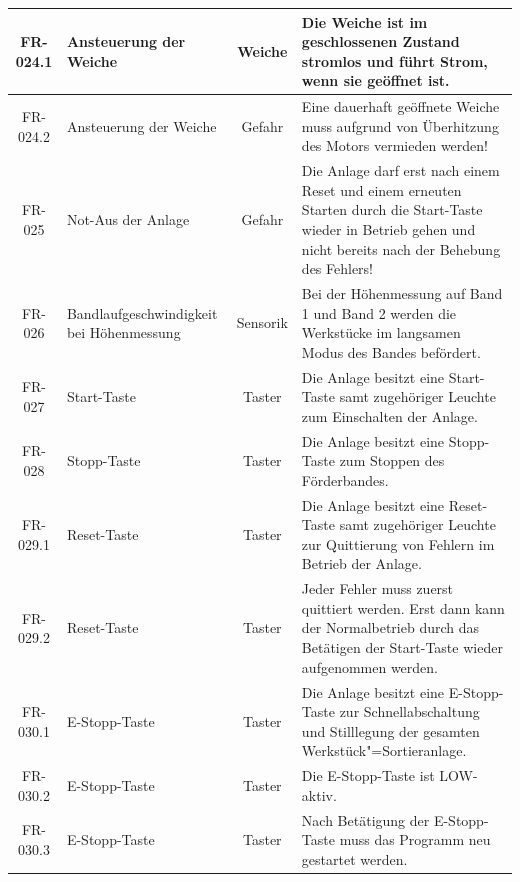 \documentclass[oneside,a4paper,titlepage]{scrartcl}              %
\begin{document}
\begin{small}
\begin{center}
\begin{longtable}{|c|p{4cm}|c|p{7cm}|}
      \hline
      \rowcolor{lightgray} FR-024.1 & Ansteuerung der Weiche & Weiche & Die Weiche ist im geschlossenen Zustand stromlos und führt Strom, wenn sie geöffnet ist.\\
      \hline
      \rowcolor{lightgray} FR-024.2 & Ansteuerung der Weiche & Gefahr & Eine dauerhaft geöffnete Weiche muss aufgrund von Überhitzung des Motors vermieden werden!\\
      \hline
      FR-025 & Not-Aus der Anlage & Gefahr & Die Anlage darf erst nach einem Reset und einem erneuten Starten durch die Start-Taste wieder in Betrieb gehen und nicht bereits nach der Behebung des Fehlers!\\
      \hline
      \rowcolor{lightgray} FR-026 & Bandlaufgeschwindigkeit bei Höhenmessung & Sensorik & Bei der Höhenmessung auf Band 1 und Band 2 werden die Werkstücke im langsamen Modus des Bandes befördert.\\
      \hline
      FR-027 & Start-Taste & Taster & Die Anlage besitzt eine Start-Taste samt zugehöriger Leuchte zum Einschalten der Anlage.\\
      \hline
      \rowcolor{lightgray} FR-028 & Stopp-Taste & Taster & Die Anlage besitzt eine Stopp-Taste zum Stoppen des Förderbandes.\\
      \hline
      FR-029.1 & Reset-Taste & Taster & Die Anlage besitzt eine Reset-Taste samt zugehöriger Leuchte zur Quittierung von Fehlern im Betrieb der Anlage.\\
      \hline
      FR-029.2 & Reset-Taste & Taster & Jeder Fehler muss zuerst quittiert werden. Erst dann kann der Normalbetrieb durch das Betätigen der Start-Taste wieder aufgenommen werden.\\
      \hline
      \rowcolor{lightgray} FR-030.1 & E-Stopp-Taste & Taster & Die Anlage besitzt eine E-Stopp-Taste zur Schnellabschaltung und Stilllegung der gesamten Werkstück"=Sortieranlage.\\
      \hline
      \rowcolor{lightgray} FR-030.2 & E-Stopp-Taste & Taster & Die E-Stopp-Taste ist LOW-aktiv.\\
      \hline
      \rowcolor{lightgray} FR-030.3 & E-Stopp-Taste & Taster & Nach Betätigung der E-Stopp-Taste muss das Programm neu gestartet werden.\\
      \hline
    \end{longtable}
  \end{center}
\end{small}

\newpage

\end{document}
